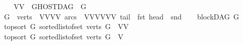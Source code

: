 \begin{isabellebody}
\ \ \isamarkupfalse%
\ {\isachardoublequoteopen}{\isacharparenleft}{\kern0pt}V{}{\isacharcomma}{\kern0pt}V{}{\isacharparenright}{\kern0pt}\ {\isasymnotin}\ GHOSTDAG\ {}\ {\isacharquery}{\kern0pt}G{}{\isachardoublequoteclose}\isanewline
\isanewline
\isanewline
\ \ \isamarkupfalse%
\ {\isacharquery}{\kern0pt}G{}\ {\isacharequal}{\kern0pt}\ {\isachardoublequoteopen}{\isasymlparr}verts\ {\isacharequal}{\kern0pt}\ {\isacharbraceleft}{\kern0pt}V{}{\isacharcomma}{\kern0pt}V{}{\isacharcomma}{\kern0pt}V{}{\isacharcomma}{\kern0pt}V{}{\isacharbraceright}{\kern0pt}{\isacharcomma}{\kern0pt}\ arcs\ {\isacharequal}{\kern0pt}\ {\isacharbraceleft}{\kern0pt}{\isacharparenleft}{\kern0pt}V{}{\isacharcomma}{\kern0pt}V{}{\isacharparenright}{\kern0pt}{\isacharcomma}{\kern0pt}{\isacharparenleft}{\kern0pt}V{}{\isacharcomma}{\kern0pt}V{}{\isacharparenright}{\kern0pt}{\isacharcomma}{\kern0pt}{\isacharparenleft}{\kern0pt}V{}{\isacharcomma}{\kern0pt}V{}{\isacharparenright}{\kern0pt}{\isacharbraceright}{\kern0pt}{\isacharcomma}{\kern0pt}\ tail\ {\isacharequal}{\kern0pt}\ fst{\isacharcomma}{\kern0pt}\ head\ {\isacharequal}{\kern0pt}\ snd{\isasymrparr}{\isachardoublequoteclose}\isanewline
\ \ \isamarkupfalse%
\ {\isachardoublequoteopen}blockDAG\ {\isacharquery}{\kern0pt}G{}{\isachardoublequoteclose}\isanewline
\ \ \isamarkupfalse%
\ {\isachardoublequoteopen}top{\isacharunderscore}{\kern0pt}sort\ {\isacharquery}{\kern0pt}G{}\ {\isacharparenleft}{\kern0pt}sorted{\isacharunderscore}{\kern0pt}list{\isacharunderscore}{\kern0pt}of{\isacharunderscore}{\kern0pt}set\ {\isacharparenleft}{\kern0pt}verts\ {\isacharquery}{\kern0pt}G{}\ {\isacharminus}{\kern0pt}\ {\isacharbraceleft}{\kern0pt}V{}{\isacharcomma}{\kern0pt}V{}{\isacharbraceright}{\kern0pt}{\isacharparenright}{\kern0pt}{\isacharparenright}{\kern0pt}{\isachardoublequoteclose}\isanewline
\ \ \isamarkupfalse%
\ {\isachardoublequoteopen}top{\isacharunderscore}{\kern0pt}sort\ {\isacharquery}{\kern0pt}G{}\ {\isacharparenleft}{\kern0pt}sorted{\isacharunderscore}{\kern0pt}list{\isacharunderscore}{\kern0pt}of{\isacharunderscore}{\kern0pt}set\ {\isacharparenleft}{\kern0pt}verts\ {\isacharquery}{\kern0pt}G{}\ {\isacharminus}{\kern0pt}\ {\isacharbraceleft}{\kern0pt}V{}{\isacharbraceright}{\kern0pt}{\isacharparenright}{\kern0pt}{\isacharparenright}{\kern0pt}{\isachardoublequoteclose}%
\endisatagproof
{\isafoldproof}%
%
\isadelimproof
\isanewline
%
\endisadelimproof
\isanewline
\isanewline
{}\isamarkupfalse%
\isanewline
\isanewline
%
\isadelimtheory
\isanewline
%
\endisadelimtheory
%
\isatagtheory
{}\isamarkupfalse%
%
\endisatagtheory
{\isafoldtheory}%
%
\isadelimtheory
%
\endisadelimtheory
%
\end{isabellebody}%
